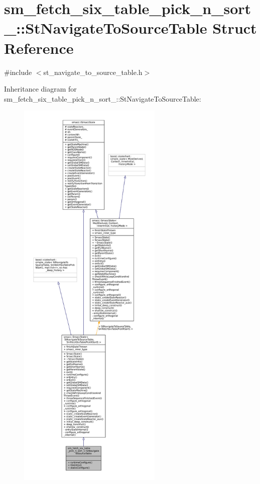 \hypertarget{structsm__fetch__six__table__pick__n__sort__1_1_1StNavigateToSourceTable}{}\section{sm\+\_\+fetch\+\_\+six\+\_\+table\+\_\+pick\+\_\+n\+\_\+sort\+\_\+:\+:St\+Navigate\+To\+Source\+Table Struct Reference}
\label{structsm__fetch__six__table__pick__n__sort__1_1_1StNavigateToSourceTable}


{\ttfamily \#include $<$st\+\_\+navigate\+\_\+to\+\_\+source\+\_\+table.\+h$>$}



Inheritance diagram for sm\+\_\+fetch\+\_\+six\+\_\+table\+\_\+pick\+\_\+n\+\_\+sort\+\_\+:\+:St\+Navigate\+To\+Source\+Table\+:
\nopagebreak
\begin{figure}[H]
\begin{center}
\leavevmode
\includegraphics[height=550pt]{structsm__fetch__six__table__pick__n__sort__1_1_1StNavigateToSourceTable__inherit__graph}
\end{center}
\end{figure}


